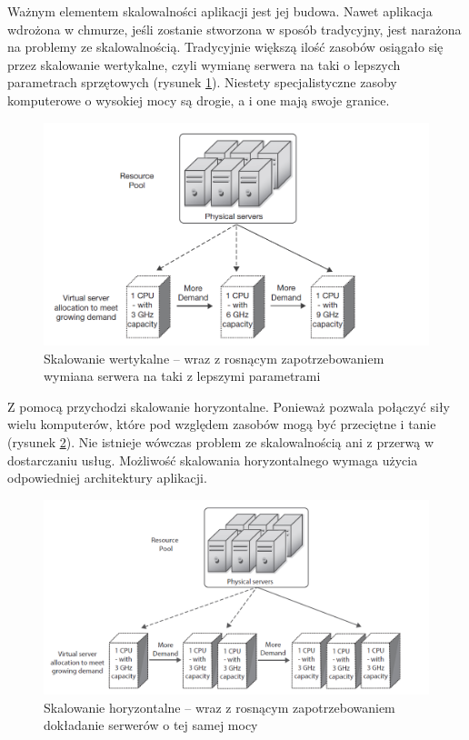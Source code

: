 \documentclass[12pt,a4paper,twoside,titlepage,openright]{book}
\begin{document}
Ważnym elementem skalowalności aplikacji jest jej budowa. Nawet aplikacja wdrożona w chmurze, jeśli zostanie stworzona w sposób tradycyjny, jest narażona na problemy ze skalowalnością. Tradycyjnie większą ilość zasobów osiągało się przez skalowanie wertykalne, czyli wymianę serwera na taki o lepszych parametrach sprzętowych (rysunek \ref{fig:skalowanie-wertykalne}). Niestety specjalistyczne zasoby komputerowe o wysokiej mocy są drogie, a i one mają swoje granice. 

\begin{figure}[h!]
	\centering
			\includegraphics[width=\textwidth]{skalowanie-wertykalne.png}
		\caption{Skalowanie wertykalne -- wraz z rosnącym zapotrzebowaniem wymiana serwera na taki z lepszymi parametrami \cite{ccCambridge}}
		\label{fig:skalowanie-wertykalne}
\end{figure}

Z pomocą przychodzi skalowanie horyzontalne. Ponieważ pozwala połączyć siły wielu komputerów, które pod względem zasobów mogą być przeciętne i tanie (rysunek \ref{fig:skalowanie-horyzontalne}). Nie istnieje wówczas problem ze skalowalnością ani z przerwą w dostarczaniu usług. Możliwość skalowania horyzontalnego wymaga użycia odpowiedniej architektury aplikacji.

\begin{figure}[h!]
	\centering
			\includegraphics[width=\textwidth]{skalowanie-horyzontalne.png}
		\caption{Skalowanie horyzontalne -- wraz z rosnącym zapotrzebowaniem dokładanie serwerów o tej samej mocy \cite{ccCambridge}}
		\label{fig:skalowanie-horyzontalne}
\end{figure}
\end{document}
